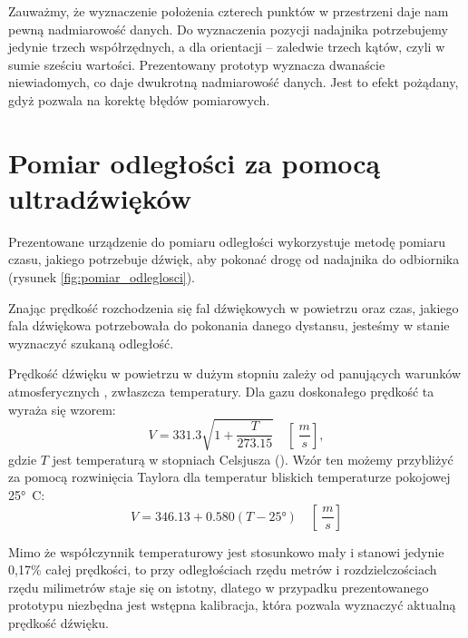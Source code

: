 Zauważmy, że wyznaczenie położenia czterech punktów w przestrzeni daje nam pewną nadmiarowość
danych. Do wyznaczenia pozycji nadajnika potrzebujemy jedynie trzech współrzędnych,
a dla orientacji -- zaledwie trzech kątów, czyli w sumie sześciu wartości.
Prezentowany prototyp wyznacza  dwanaście niewiadomych, co daje dwukrotną nadmiarowość danych.
Jest to efekt pożądany, gdyż pozwala na korektę błędów pomiarowych.


\section{Pomiar odległości za pomocą ultradźwięków}

Prezentowane urządzenie do pomiaru odległości wykorzystuje metodę pomiaru czasu, jakiego
potrzebuje dźwięk, aby pokonać drogę od nadajnika do odbiornika
(rysunek \ref{fig:pomiar_odleglosci}).

Znając prędkość rozchodzenia się fal dźwiękowych w powietrzu oraz czas, jakiego fala dźwiękowa potrzebowała
do pokonania danego dystansu, jesteśmy w stanie wyznaczyć szukaną odległość.

Prędkość dźwięku w powietrzu w dużym stopniu zależy od panujących warunków atmosferycznych \cite{bib:soundSpeed},
zwłaszcza temperatury.
Dla gazu doskonałego prędkość ta wyraża się wzorem:
\[
V = \num{331,3}  \sqrt{1+\frac{T}{\num{273,15}}} \quad \left[ \SI{}{\frac{m}{s}} \right],
\]
gdzie $T$ jest temperaturą w stopniach Celsjusza (\SI{}{\degC}).
Wzór ten możemy przybliżyć za pomocą rozwinięcia Taylora dla temperatur bliskich temperaturze pokojowej \ang{25}\SI{}{C}:
\[
 V = \num{346,13}  +  \num{0,580}(T - \ang{25})  \quad \left[ \SI{}{ \frac{m}{s}} \right]
\]

Mimo że współczynnik temperaturowy jest stosunkowo mały i stanowi jedynie 0,17\% całej prędkości,
to przy odległościach rzędu metrów i rozdzielczościach rzędu milimetrów staje się on istotny, 
dlatego w przypadku prezentowanego prototypu niezbędna jest wstępna kalibracja, która pozwala
wyznaczyć aktualną prędkość dźwięku.






